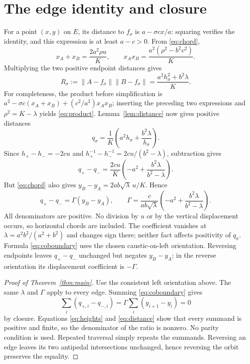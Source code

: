 \documentclass[10pt]{article}
\begin{document}
\section{The edge identity and closure}
For a point $(x,y)$ on $E$, its distance to $f_\sigma$ is
$a-\sigma cx/a$: squaring verifies the identity, and this expression
is at least $a-c>0$. From \eqref{eq:chord},
\[
 x_A+x_B=\frac{2a^2\rho u}{K},\qquad
 x_Ax_B=\frac{a^2(\rho^2-b^2v^2)}{K}.
\]
Multiplying the two positive endpoint distances gives
\begin{equation}\label{eq:product}
 R_\sigma:=\lVert A-f_\sigma\rVert\lVert B-f_\sigma\rVert
 =\frac{a^2h_\sigma^2+b^2\lambda}{K}.
\end{equation}
For completeness, the product before simplification is
$a^2-\sigma c(x_A+x_B)+(c^2/a^2)x_Ax_B$; inserting the preceding
two expressions and $\rho^2=K-\lambda$ yields \eqref{eq:product}.
Lemma~\ref{lem:distance} now gives positive distances
\begin{equation}\label{eq:q}
 q_\sigma=\frac{1}{K}
     \left(a^2h_\sigma+\frac{b^2\lambda}{h_\sigma}\right).
\end{equation}
Since $h_+-h_-=-2cu$ and
$h_+^{-1}-h_-^{-1}=2cu/(b^2-\lambda)$, subtraction gives
\begin{equation}\label{eq:difference}
 q_+-q_-=\frac{2cu}{K}
      \left(-a^2+\frac{b^2\lambda}{b^2-\lambda}\right).
\end{equation}
But \eqref{eq:chord} also gives
$y_B-y_A=2ab\sqrt\lambda\,u/K$. Hence
\begin{equation}\label{eq:coboundary}
 \boxed{q_+-q_-=\Gamma(y_B-y_A)},\qquad
 \Gamma=\frac{c}{ab\sqrt\lambda}
       \left(-a^2+\frac{b^2\lambda}{b^2-\lambda}\right).
\end{equation}
All denominators are positive. No division by $u$ or by the vertical
displacement occurs, so horizontal chords are included. The coefficient
vanishes at $\lambda=a^2b^2/(a^2+b^2)$ and changes sign there;
neither fact affects positivity of $q_\sigma$.
Formula \eqref{eq:coboundary} uses the chosen caustic-on-left orientation.
Reversing endpoints leaves $q_+-q_-$ unchanged but negates $y_B-y_A$;
in the reverse orientation its displacement coefficient is $-\Gamma$.

\begin{proof}[Proof of Theorem~\ref{thm:main}]
Use the consistent left orientation above. The same $\lambda$ and
$\Gamma$ apply to every edge. Summing \eqref{eq:coboundary} gives
\[
 \sum_i(q_{+,i}-q_{-,i})
 =\Gamma\sum_i(y_{i+1}-y_i)=0
\]
by closure. Equations \eqref{eq:heights} and \eqref{eq:distance} show
that every summand is positive and finite, so the denominator of the
ratio is nonzero. No parity condition is used. Repeated traversal simply
repeats the summands. Reversing an edge leaves its two antipedal
intersections unchanged, hence reversing the orbit preserves the equality.
\end{proof}
\end{document}
